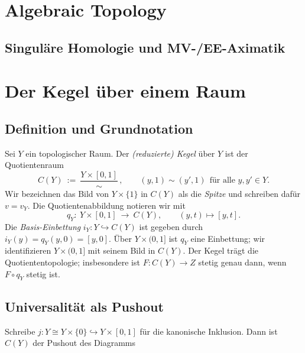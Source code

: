 \documentclass[10pt, letterpaper]{article}
\begin{document}
\begin{outline}
  \1 
\end{outline}


\vspace{0.5cm}













\pagebreak


\section{Algebraic Topology}



\subsection{Singuläre Homologie und MV-/EE-Aximatik}


\section{Der Kegel über einem Raum}\label{sec:cone}

\subsection{Definition und Grundnotation}
Sei $Y$ ein topologischer Raum. Der \emph{(reduzierte) Kegel} über $Y$ ist der Quotientenraum
\[
  C(Y)\ :=\ \frac{Y\times[0,1]}{\sim}\,,
  \qquad 
  (y,1)\sim(y',1)\ \ \text{für alle }y,y'\in Y.
\]
Wir bezeichnen das Bild von $Y\times\{1\}$ in $C(Y)$ als die \emph{Spitze} und schreiben dafür $v=v_Y$.
Die Quotientenabbildung notieren wir mit
\[
  q_Y:\ Y\times[0,1]\ \longrightarrow\ C(Y),\qquad (y,t)\longmapsto [y,t].
\]
Die \emph{Basis-Einbettung} $i_Y:Y\hookrightarrow C(Y)$ ist gegeben durch $i_Y(y)=q_Y(y,0)=[y,0]$.
Über $Y\times(0,1]$ ist $q_Y$ eine Einbettung; wir identifizieren $Y\times(0,1]$ mit seinem Bild in $C(Y)$.
Der Kegel trägt die Quotiententopologie; insbesondere ist $F:C(Y)\to Z$ stetig genau dann, wenn $F\circ q_Y$ stetig ist.

\subsection{Universalität als Pushout}
Schreibe $j:Y\cong Y\times\{0\}\hookrightarrow Y\times[0,1]$ für die kanonische Inklusion. Dann ist $C(Y)$ der Pushout des Diagramms
\begin{center}
\begingroup{}
\endgroup
\end{center}
\end{document}
